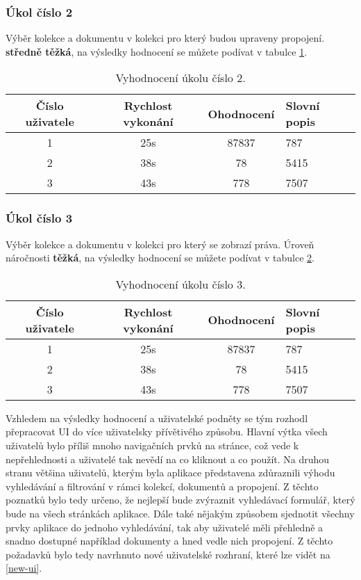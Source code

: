 \subsubsection{Úkol číslo 2} Výběr kolekce a dokumentu v kolekci pro který budou upraveny propojení. \textbf{středně těžká}, na výsledky hodnocení se můžete podívat v tabulce \ref{ukol-2}.
\begin{table}[htp]
\begin{center}
\begin{tabular}{ || c || c | c |  m{5cm} || } 
 \hline
 Číslo uživatele & Rychlost vykonání & Ohodnocení & Slovní popis \\ [0.5ex] 
 \hline
 \hline
 1 & 25s & 87837 & 787 \\ 
 \hline
 2 & 38s & 78 & 5415 \\
 \hline
 3 & 43s & 778 & 7507 \\
 \hline
\end{tabular}
\end{center}
\caption{Vyhodnocení úkolu číslo 2.}
\label{ukol-2}
\end{table}
\subsubsection{Úkol číslo 3} Výběr kolekce a dokumentu v kolekci pro který se zobrazí práva. Úroveň náročnosti \textbf{těžká}, na výsledky hodnocení se můžete podívat v tabulce \ref{ukol-3}.
\begin{table}[htp]
\begin{center}
\begin{tabular}{ || c || c | c |  m{5cm} || } 
 \hline
 Číslo uživatele & Rychlost vykonání & Ohodnocení & Slovní popis \\ [0.5ex] 
 \hline
 \hline
 1 & 25s & 87837 & 787 \\ 
 \hline
 2 & 38s & 78 & 5415 \\
 \hline
 3 & 43s & 778 & 7507 \\
 \hline
\end{tabular}
\end{center}
\caption{Vyhodnocení úkolu číslo 3.}
\label{ukol-3}
\end{table}

\par Vzhledem na výsledky hodnocení a uživatelské podněty se tým rozhodl přepracovat UI do více uživatelsky přívětivého způsobu. Hlavní výtka všech uživatelů bylo příliš mnoho navigačních prvků na stránce, což vede k nepřehlednosti a uživatelé tak nevědí na co kliknout a co použít. Na druhou stranu většina uživatelů, kterým byla aplikace představena zdůraznili výhodu vyhledávání a filtrování v rámci kolekcí, dokumentů a propojení. Z těchto poznatků bylo tedy určeno, že nejlepší bude zvýraznit vyhledávací formulář, který bude na všech stránkách aplikace. Dále také nějakým způsobem sjednotit všechny prvky aplikace do jednoho vyhledávání, tak aby uživatelé měli přehledně a snadno dostupné například dokumenty a hned vedle nich propojení. Z těchto požadavků bylo tedy navrhnuto nové uživatelské rozhraní, které lze vidět na \ref{new-ui}.

